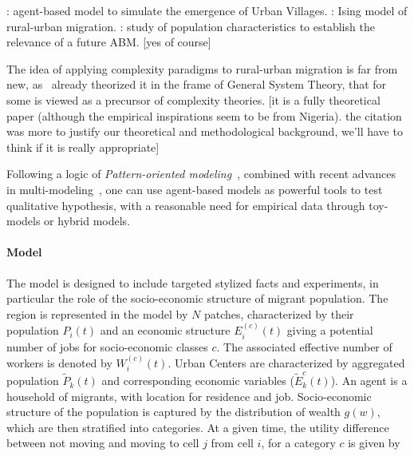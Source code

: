 \cite{xie2007simulating} : agent-based model to simulate the emergence of Urban Villages. \cite{silveira2006agent} : Ising model of rural-urban migration. \cite{fernandez2005characterizing} : study of population characteristics to establish the relevance of a future ABM. [yes of course]

The idea of applying complexity paradigms to rural-urban migration is far from new, as~\cite{mabogunje1970systems} already theorized it in the frame of General System Theory, that for some is viewed as a precursor of complexity theories. [it is a fully theoretical paper (although the empirical inspirations seem to be from Nigeria). the citation was more to justify our theoretical and methodological background, we'll have to think if it is really appropriate]

Following a logic of \emph{Pattern-oriented modeling}~\cite{grimm2005pattern}, combined with recent advances in multi-modeling~\cite{cottineau2016back}, one can use agent-based models as powerful tools to test qualitative hypothesis, with a reasonable need for empirical data through toy-models or hybrid models.



\paragraph{Model}


The model is designed to include targeted stylized facts and experiments, in particular the role of the socio-economic structure of migrant population. %
 The region is represented in the model by $N$ patches, characterized by their population $P_i(t)$ and an economic structure $E_i^{(c)}(t)$ giving a potential number of jobs for socio-economic classes $c$. The associated effective number of workers is denoted by $W_i^{(c)}(t)$.%
 Urban Centers are characterized by aggregated population $\tilde{P}_k(t)$ and corresponding economic variables ($\tilde{E}_k^{c}(t)$). An agent is a household of migrants, with location for residence and job. Socio-economic structure of the population is captured by the distribution of wealth $g(w)$, which are then stratified into categories. At a given time, the utility difference between not moving and moving to cell $j$ from cell $i$, for a category $c$ is given by

